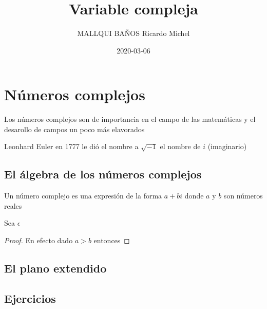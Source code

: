 \documentclass[]{book}
\title{Variable compleja}
\author{MALLQUI BAÑOS Ricardo Michel}
\date{2020-03-06}
\theoremstyle{definition}
\theoremstyle{definition}
\theoremstyle{definition}
\theoremstyle{remark}
\let\BeginKnitrBlock\begin \let\EndKnitrBlock\end
\begin{document}
\maketitle

{
\setcounter{tocdepth}{1}
\tableofcontents
}
\hypertarget{nuxfameros-complejos}{%
\chapter{Números complejos}\label{nuxfameros-complejos}}

Los números complejos son de importancia en el campo de las matemáticas y el desarollo de campos un poco más elavorados

Leonhard Euler en 1777 le dió el nombre a \(\sqrt{-1}\) el nombre de \(i\) (imaginario)

\hypertarget{el-uxe1lgebra-de-los-nuxfameros-complejos}{%
\section{El álgebra de los números complejos}\label{el-uxe1lgebra-de-los-nuxfameros-complejos}}

\BeginKnitrBlock{definition}[Número complejo]
\protect\hypertarget{def:unnamed-chunk-1}{}{\label{def:unnamed-chunk-1} \iffalse (Número complejo) \fi{} }Un número complejo es una expresión de la forma \(a+bi\) donde \(a\) y \(b\) son números reales
\EndKnitrBlock{definition}

\BeginKnitrBlock{theorem}
\protect\hypertarget{thm:unnamed-chunk-2}{}{\label{thm:unnamed-chunk-2} }Sea \(\epsilon\)
\EndKnitrBlock{theorem}

\BeginKnitrBlock{proof}
\iffalse{} {Demostración. } \fi{}En efecto dado \(a>b\) entonces
\EndKnitrBlock{proof}

\hypertarget{el-plano-extendido}{%
\section{El plano extendido}\label{el-plano-extendido}}

\hypertarget{ejercicios}{%
\section{Ejercicios}\label{ejercicios}}

\BeginKnitrBlock{exercise}
\protect\hypertarget{exr:unnamed-chunk-4}{}{\label{exr:unnamed-chunk-4} }
\EndKnitrBlock{exercise}

\BeginKnitrBlock{solution}
\iffalse{} {Solución. } \fi{}
\EndKnitrBlock{solution}
\end{document}
